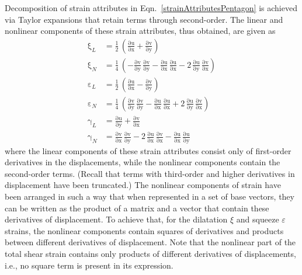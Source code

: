 Decomposition of strain attributes in Eqn.~\eqref{strainAttributesPentagon} is achieved via Taylor expansions that retain terms through second-order.  The linear and nonlinear components of these strain attributes, thus obtained, are given as
\begin{subequations}
	\begin{align}
		\mathrm \xi_{L} & = \frac{1}{2} \, \left(\mathrm{\frac{\partial u}{\partial x}} + \mathrm{\frac{\partial v}{\partial y}}\right)\\
		\mathrm \xi_{N} & = \frac{1}{4} \, \left(- \mathrm{\frac{ \partial v}{\partial y}}\, \mathrm{\frac{ \partial v}{\partial y}} -\mathrm{\frac{\partial u}{\partial x}}\, \mathrm{\frac{\partial u}{\partial x}} - 2 \, \mathrm{\frac{\partial u}{\partial y}}\, \mathrm{\frac{\partial v}{\partial x}}\right)\\
		\mathrm \varepsilon_{L} & = \frac{1}{2} \, \left(\mathrm{\frac{\partial u}{\partial x}} - \mathrm{\frac{\partial v}{\partial y}}\right)\\
		\mathrm \varepsilon_{N} & = \frac{1}{4} \, \left(\mathrm{\frac{ \partial v}{\partial y}}\, \mathrm{\frac{ \partial v}{\partial y}} -\mathrm{\frac{\partial u}{\partial x}}\, \mathrm{\frac{\partial u}{\partial x}} + 2 \, \mathrm{\frac{\partial u}{\partial y}}\, \mathrm{\frac{\partial v}{\partial x}}\right)\\
		\mathrm \gamma_{L} & = \mathrm{\frac{\partial u}{\partial y}} + \mathrm{\frac{\partial v}{\partial x}}\\
		\mathrm \gamma_{N} & = \mathrm{\frac{\partial v}{\partial x}}\, \mathrm{\frac{\partial v}{\partial y}} - 2\, \mathrm{\frac{ \partial u}{\partial x}}\, \mathrm{\frac{ \partial v}{\partial x}} 
		-\mathrm{\frac{\partial u}{\partial x}}\, \mathrm{\frac{\partial u}{\partial y}} 
	\end{align}
\end{subequations}
where the linear components of these strain attributes consist only of first-order derivatives in the displacements, while the nonlinear components contain the second-order terms. (Recall that terms with third-order and higher derivatives in displacement have been truncated.) The nonlinear components of strain have been arranged in such a way that when represented in a set of base vectors, they can be written as the product of a matrix and a vector that contain these derivatives of displacement.  To achieve that, for the dilatation $\xi$ and squeeze $\varepsilon$ strains, the nonlinear components contain squares of derivatives and products between different derivatives of displacement. Note that the nonlinear part of the total shear strain contains only products of different derivatives of displacements, i.e., no square term is present in its expression. 


